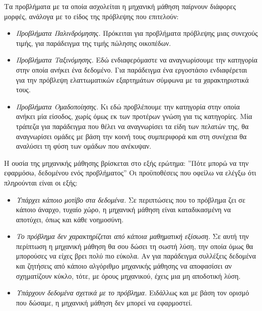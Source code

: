 \documentclass[11pt]{report}
\begin{document}
Τα προβλήματα με τα οποία ασχολείται η μηχανική μάθηση παίρνουν διάφορες μορφές, ανάλογα με το είδος της πρόβλεψης που επιτελούν:
\begin{itemize}
\item \textit{Προβλήματα Παλινδρόμησης.} Πρόκειται για προβλήματα πρόβλεψης μιας συνεχούς τιμής, για παράδειγμα της τιμής πώλησης οικοπέδων.
\item \textit{Προβλήματα Ταξινόμησης.} Εδώ ενδιαφερόμαστε να αναγνωρίσουμε την κατηγορία στην οποία ανήκει ένα δεδομένο. Για παράδειγμα ένα εργοστάσιο ενδιαφέρεται για την πρόβλεψη ελαττωματικών εξαρτημάτων σύμφωνα με τα χαρακτηριστικά τους.
\item \textit{Προβλήματα Ομαδοποίησης.} Κι εδώ προβλέπουμε την κατηγορία στην οποία ανήκει μία είσοδος, χωρίς όμως εκ των προτέρων γνώση για τις κατηγορίες. Μία τράπεζα για παράδειγμα που θέλει να αναγνωρίσει τα είδη των πελατών της, θα αναγνωρίσει ομάδες με βάση την κοινή τους συμπεριφορά και στη συνέχεια θα αναλύσει τη φύση των ομάδων που ανέκυψαν. 
\end{itemize}
Η ουσία της μηχανικής μάθησης βρίσκεται στο εξής ερώτημα: ''Πότε μπορώ να την εφαρμόσω, δεδομένου ενός προβλήματος'' Οι προϋποθέσεις που οφείλω να ελέγξω ότι πληρούνται είναι οι εξής:
\begin{itemize}
\item \textit{Υπάρχει κάποιο μοτίβο στα δεδομένα.} Σε περιπτώσεις που το πρόβλημα ζει σε κάποιο άναρχο, τυχαίο χώρο, η μηχανική μάθηση είναι καταδικασμένη να αποτύχει, όπως και κάθε νοημοσύνη.
\item \textit{Το πρόβλημα δεν χαρακτηρίζεται από κάποια μαθηματική εξίσωση.} Σε αυτή την περίπτωση η μηχανική μάθηση θα σου δώσει τη σωστή λύση, την οποία όμως θα μπορούσες να είχες βρει πολύ πιο εύκολα. Αν για παράδειγμα συλλέξεις δεδομένα και ζητήσεις από κάποιο αλγόριθμο μηχανικής μάθησης να αποφασίσει αν σχηματίζουν κύκλο, τότε, με όρους μηχανικού, έχεις μια μη αποδοτική λύση. 
\item \textit{Υπάρχουν δεδομένα σχετικά με το πρόβλημα.} Ειδάλλως και με βάση τον ορισμό που δώσαμε, η μηχανική μάθηση δεν μπορεί να εφαρμοστεί.
\end{itemize}
\end{document}
